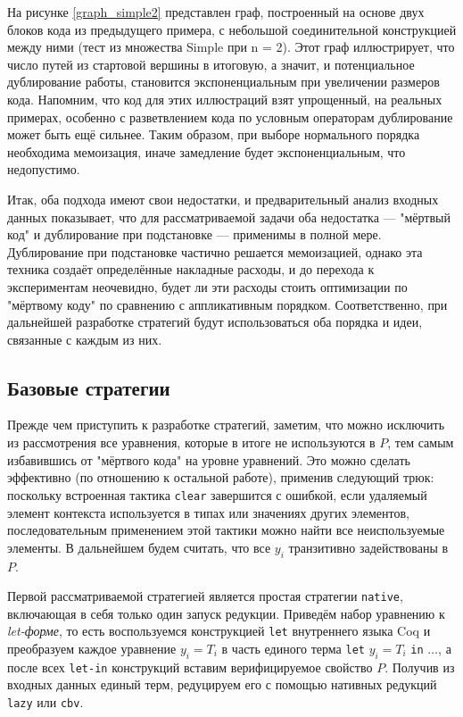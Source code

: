\documentclass[../thesis.tex]{subfiles}
\begin{document}
На рисунке \ref{graph_simple2} представлен граф, построенный на основе двух блоков кода из предыдущего примера, с небольшой соединительной конструкцией между ними (тест из множества Simple при n = 2). Этот граф иллюстрирует, что число путей из стартовой вершины в итоговую, а значит, и потенциальное дублирование работы, становится экспоненциальным при увеличении размеров кода. Напомним, что код для этих иллюстраций взят упрощенный, на реальных примерах, особенно с разветвлением кода по условным операторам дублирование может быть ещё сильнее. Таким образом, при выборе нормального порядка необходима мемоизация, иначе замедление будет экспоненциальным, что недопустимо.

Итак, оба подхода имеют свои недостатки, и предварительный анализ входных данных показывает, что для рассматриваемой задачи оба недостатка --- "мёртвый код" и дублирование при подстановке --- применимы в полной мере. Дублирование при подстановке частично решается мемоизацией, однако эта техника создаёт определённые накладные расходы, и до перехода к экспериментам неочевидно, будет ли эти расходы стоить оптимизации по "мёртвому коду" по сравнению с аппликативным порядком. Соответственно, при дальнейшей разработке стратегий будут использоваться оба порядка и идеи, связанные с каждым из них.

\subsection{Базовые стратегии}

Прежде чем приступить к разработке стратегий, заметим, что можно исключить из рассмотрения все уравнения, которые в итоге не используются в $P$, тем самым избавившись от "мёртвого кода" на уровне уравнений. Это можно сделать эффективно (по отношению к остальной работе), применив следующий трюк: поскольку встроенная тактика \texttt{clear} завершится с ошибкой, если удаляемый элемент контекста используется в типах или значениях других элементов, последовательным применением этой тактики можно найти все неиспользуемые элементы. В дальнейшем будем считать, что все $y_i$ транзитивно задействованы в $P$.

Первой рассматриваемой стратегией является простая стратегии \texttt{native}, включающая в себя только один запуск редукции. Приведём набор уравнению к \textit{let-форме}, то есть воспользуемся конструкцией \texttt{let} внутреннего языка Coq и преобразуем каждое уравнение $y_i = T_i$ в часть единого терма \texttt{let} $y_i = T_i$ \texttt{in} $\dots$, а после всех \texttt{let-in} конструкций вставим верифицируемое свойство $P$. Получив из входных данных единый терм, редуцируем его с помощью нативных редукций \texttt{lazy} или \texttt{cbv}.
\end{document}
